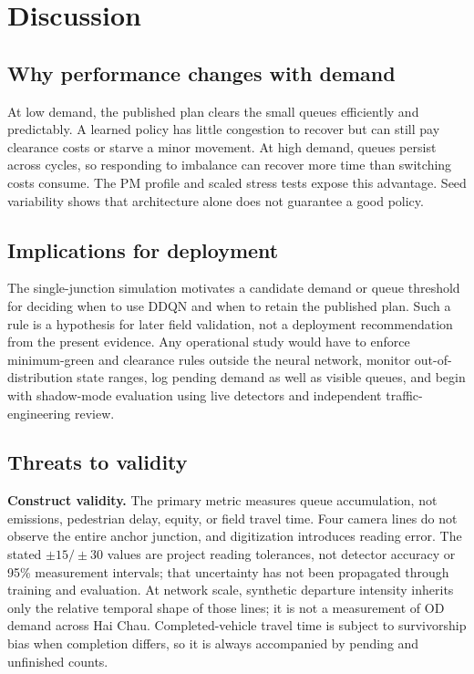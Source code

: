 \documentclass[12pt,a4paper]{report}
\begin{document}
\chapter{Discussion}\label{ch:discussion}

\section{Why performance changes with demand}
At low demand, the published plan clears the small queues efficiently and predictably. A learned policy has little congestion to recover but can still pay clearance costs or starve a minor movement. At high demand, queues persist across cycles, so responding to imbalance can recover more time than switching costs consume. The PM profile and scaled stress tests expose this advantage. Seed variability shows that architecture alone does not guarantee a good policy.

\section{Implications for deployment}
The single-junction simulation motivates a candidate demand or queue threshold for deciding when to use DDQN and when to retain the published plan. Such a rule is a hypothesis for later field validation, not a deployment recommendation from the present evidence. Any operational study would have to enforce minimum-green and clearance rules outside the neural network, monitor out-of-distribution state ranges, log pending demand as well as visible queues, and begin with shadow-mode evaluation using live detectors and independent traffic-engineering review.

\section{Threats to validity}
\textbf{Construct validity.} The primary metric measures queue accumulation, not emissions, pedestrian delay, equity, or field travel time. Four camera lines do not observe the entire anchor junction, and digitization introduces reading error. The stated $\pm15/\pm30$ values are project reading tolerances, not detector accuracy or 95\% measurement intervals; that uncertainty has not been propagated through training and evaluation. At network scale, synthetic departure intensity inherits only the relative temporal shape of those lines; it is not a measurement of OD demand across Hai Chau. Completed-vehicle travel time is subject to survivorship bias when completion differs, so it is always accompanied by pending and unfinished counts.
\end{document}

